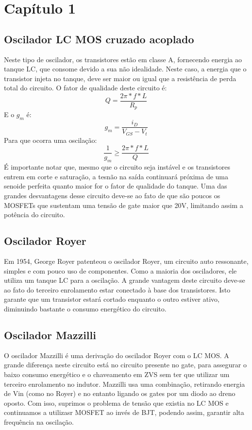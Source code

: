 \chapter{Capítulo 1}\label{chap-1}

\section{Oscilador LC MOS cruzado acoplado}
Neste tipo de oscilador, os transistores estão em classe A, fornecendo energia ao tanque LC, que consome devido a sua não idealidade. Neste caso, a energia que o transistor injeta no tanque, deve ser maior ou igual que a resistência de perda total do circuito. O fator de qualidade deste circuito é:
\begin{equation}
Q = \frac{2\pi*f*L}{R_p}
\end{equation}
E o $g_m$ é:
\begin{equation}
g_m = \frac{i_D}{V_{GS} - V_t}
\end{equation}
Para que ocorra uma oscilação:
\begin{equation}
\frac{1}{g_m} \geq \frac{2\pi*f*L}{Q}
\end{equation}
É importante notar que, mesmo que o circuito seja instável e os transistores entrem em corte e saturação, a tesnão na saída continuará próxima de uma senoide perfeita quanto maior for o fator de qualidade do tanque.
Uma das grandes desvantagens desse circuito deve-se ao fato de que são poucos os MOSFETs que sustentam uma tensão de gate maior que 20V, limitando assim a potência do circuito.


\section{Oscilador Royer}
Em 1954, George Royer patenteou o oscilador Royer, um circuito auto ressonante, simples e com pouco uso de componentes. Como a maioria dos osciladores, ele utiliza um tanque LC para a oscilação. A grande vantagem deste circuito deve-se ao fato do terceiro enrolamento estar conectado à base dos transistores. Isto garante que um transistor estará cortado enquanto o outro estiver ativo, diminuindo bastante o consumo energético do circuito.


\section{Oscilador Mazzilli}
O oscilador Mazzilli é uma derivação do oscilador Royer com o LC MOS. A grande diferença neste circuito está no circuito presente no gate, para assegurar o baixo consumo energético e o chaveamento em ZVS sem ter que utilizar um terceiro enrolamento no indutor. Mazzilli usa uma combinação, retirando energia de Vin (como no Royer) e no entanto ligando os gates por um diodo ao dreno oposto. Com isso, suprimos o problema de tensão que existia no LC MOS e continuamos a utilizasr MOSFET ao invés de BJT, podendo assim, garantir alta frequência na oscilação.

